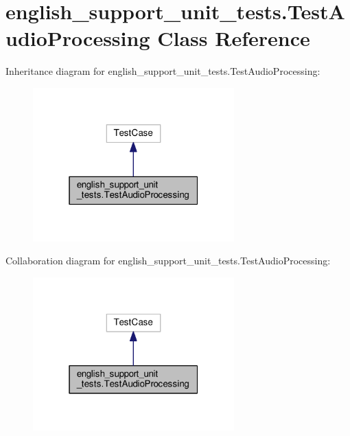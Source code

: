 \hypertarget{classenglish__support__unit__tests_1_1TestAudioProcessing}{\section{english\-\_\-support\-\_\-unit\-\_\-tests.\-Test\-Audio\-Processing Class Reference}
\label{classenglish__support__unit__tests_1_1TestAudioProcessing}
}


Inheritance diagram for english\-\_\-support\-\_\-unit\-\_\-tests.\-Test\-Audio\-Processing\-:
\nopagebreak
\begin{figure}[H]
\begin{center}
\leavevmode
\includegraphics[width=220pt]{classenglish__support__unit__tests_1_1TestAudioProcessing__inherit__graph}
\end{center}
\end{figure}


Collaboration diagram for english\-\_\-support\-\_\-unit\-\_\-tests.\-Test\-Audio\-Processing\-:
\nopagebreak
\begin{figure}[H]
\begin{center}
\leavevmode
\includegraphics[width=220pt]{classenglish__support__unit__tests_1_1TestAudioProcessing__coll__graph}
\end{center}
\end{figure}

